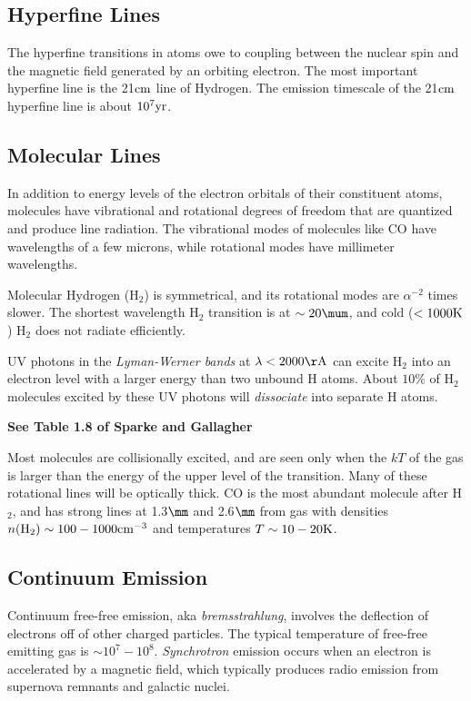 \documentclass[12pt]{article}
\begin{document}
\subsection{Hyperfine Lines}

The hyperfine transitions in atoms owe to coupling between the nuclear
spin and the magnetic field generated by an orbiting electron. The
most important hyperfine line is the 21$\mathrm{cm}$ line of Hydrogen. The
emission timescale of the 21$\mathrm{cm}$ hyperfine line is about $10^{7}\mathrm{yr}$.

\subsection{Molecular Lines}

In addition to energy levels of the electron orbitals of their
constituent atoms, molecules have vibrational and rotational 
degrees of freedom that are quantized and produce line radiation.
The vibrational modes of molecules like CO have wavelengths of
a few microns, while rotational modes have millimeter wavelengths.

Molecular Hydrogen (H$_2$) is symmetrical, and its rotational
modes are $\alpha^{-2}$ times slower. The shortest wavelength
H$_2$ transition is at $\sim20\mum$, and cold ($<1000\mathrm{K}$) H$_2$
does not radiate efficiently.

UV photons in the {\it Lyman-Werner bands} at $\lambda<2000\Ang$ can
excite H$_2$ into an electron level with a larger energy than two
unbound H atoms. About $10\%$ of H$_2$ molecules excited by these UV
photons will {\it dissociate} into separate H atoms.

{\bf See Table 1.8 of Sparke and Gallagher}

Most molecules are collisionally excited, and are seen only
when the $kT$ of the gas is larger than the energy of the upper
level of the transition. Many of these 
rotational lines will be optically thick. CO is the most
abundant molecule after H$_2$, and has strong lines at 1.3$\mm$ and
2.6$\mm$ from gas with densities $n(\mathrm{H}_2)\sim100-1000\mathrm{cm}^{-3}$
and temperatures $T\sim10-20\mathrm{K}$.

\subsection{Continuum Emission}

Continuum free-free emission, aka {\it bremsstrahlung}, involves the
deflection of electrons off of other charged particles.
The typical temperature of free-free emitting gas is $\sim10^7-10^8$.
{\it Synchrotron} emission occurs when an electron is accelerated
by a magnetic field, which typically produces radio emission from
supernova remnants and galactic nuclei.
\end{document}
